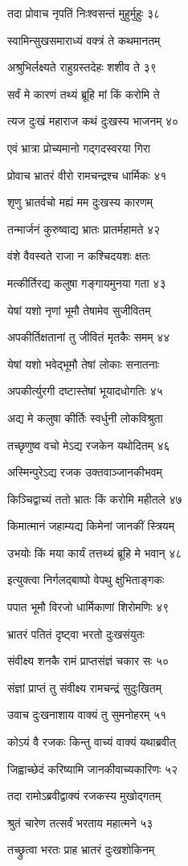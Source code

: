 तदा प्रोवाच नृपतिं निःश्वसन्तं मुहुर्मुहुः ३८

स्वामिन्सुखसमाराध्यं वक्त्रं ते कथमानतम्

अश्रुभिर्लक्ष्यते राहुग्रस्तदेहः शशीव ते ३९

सर्वं मे कारणं तथ्यं ब्रूहि मां किं करोमि ते

त्यज दुःखं महाराज कथं दुःखस्य भाजनम् ४०

एवं भ्रात्रा प्रोच्यमानो गद्गदस्वरया गिरा

प्रोवाच भ्रातरं वीरो रामचन्द्रश्च धार्मिकः ४१

शृणु भ्रातर्वचो मह्यं मम दुःखस्य कारणम्

तन्मार्जनं कुरुष्वाद्य भ्रातः प्रातर्महामते ४२

वंशे वैवस्वते राजा न कश्चिदयशः क्षतः

मत्कीर्तिरद्य कलुषा गङ्गायमुनया गता ४३

येषां यशो नृणां भूमौ तेषामेव सुजीवितम्

अपकीर्तिक्षतानां तु जीवितं मृतकैः समम् ४४

येषां यशो भवेद्भूमौ तेषां लोकाः सनातनाः

अपकीर्त्युरगी दष्टास्तेषां भूयादधोगतिः ४५

अद्य मे कलुषा कीर्तिः स्वर्धुनी लोकविश्रुता

तच्छृणुष्व वचो मेऽद्य रजकेन यथोदितम् ४६

अस्मिन्पुरेऽद्य रजक उक्तवाञ्जानकीभवम्

किञ्चिद्वाच्यं ततो भ्रातः किं करोमि महीतले ४७

किमात्मानं जहाम्यद्य किमेनां जानकीं स्त्रियम्

उभयोः किं मया कार्यं तत्तथ्यं ब्रूहि मे भवान् ४८

इत्युक्त्वा निर्गलद्बाष्पो वेपथु क्षुभिताङ्गकः

पपात भूमौ विरजो धार्मिकाणां शिरोमणिः ४९

भ्रातरं पतितं दृष्ट्वा भरतो दुःखसंयुतः

संवीक्ष्य शनकै रामं प्राप्तसंज्ञं चकार सः ५०

संज्ञां प्राप्तं तु संवीक्ष्य रामचन्द्रं सुदुःखितम्

उवाच दुःखनाशाय वाक्यं तु सुमनोहरम् ५१

कोऽयं वै रजकः किन्तु वाच्यं वाक्यं यथाब्रवीत्

जिह्वाच्छेदं करिष्यामि जानकीवाच्यकारिणः ५२

तदा रामोऽब्रवीद्वाक्यं रजकस्य मुखोद्गतम्

श्रुतं चारेण तत्सर्वं भरताय महात्मने ५३

तच्छ्रुत्वा भरतः प्राह भ्रातरं दुःखशोकिनम्

